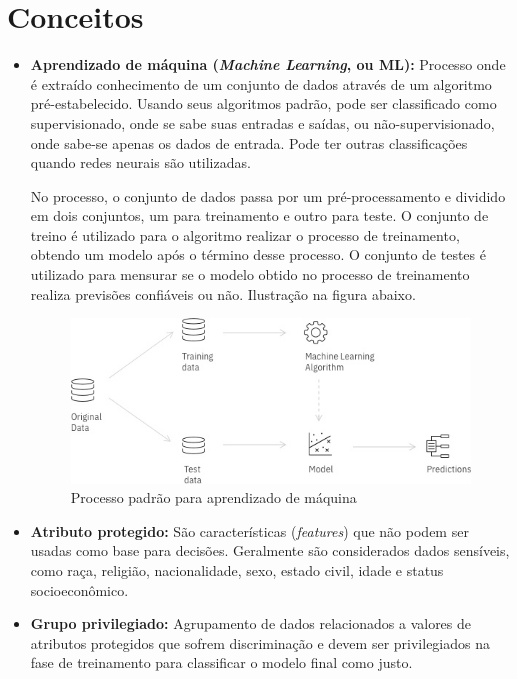 \documentclass[portugues, 12pt, a4paper]{article}
\begin{document}
\section{Conceitos}

\begin{itemize}
\item \textbf{Aprendizado de máquina (\textit{Machine Learning}, ou ML):} Processo onde é extraído conhecimento de um conjunto de dados através de um algoritmo pré-estabelecido. Usando seus algoritmos padrão, pode ser classificado como supervisionado, onde se sabe suas entradas e saídas, ou não-supervisionado, onde sabe-se apenas os dados de entrada. Pode ter outras classificações quando redes neurais são utilizadas.

No processo, o conjunto de dados passa por um pré-processamento e dividido em dois conjuntos, um para treinamento e outro para teste. O conjunto de treino é utilizado para o algoritmo realizar o processo de treinamento, obtendo um modelo após o término desse processo. O conjunto de testes é utilizado para mensurar se o modelo obtido no processo de treinamento realiza previsões confiáveis ou não. Ilustração na figura abaixo.

\begin{figure}[h]
\centering
\includegraphics[scale=0.5]{images/ML_Process.jpg}
\caption {Processo padrão para aprendizado de máquina}
\label{fig:MLProcess}
\end{figure}

\item \textbf{Atributo protegido:} São características (\textit{features}) que não podem ser usadas como base para decisões. Geralmente são considerados dados sensíveis, como raça, religião, nacionalidade, sexo, estado civil, idade e status socioeconômico.

\item \textbf{Grupo privilegiado:} Agrupamento de dados relacionados a valores de atributos protegidos que sofrem discriminação e devem ser privilegiados na fase de treinamento para classificar o modelo final como justo.


\end{itemize}
\end{document}
